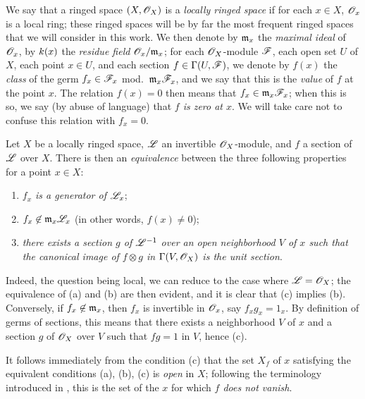 \begin{env}[5.5.1]
\label{0.5.5.1}
We say that a ringed space $(X,\mathscr{O}_X)$ is a \emph{locally ringed space} if for each $x\in X$, $\mathscr{O}_x$ is a local ring;
these ringed spaces will be by far the most frequent ringed spaces that we will consider in this work.
We then denote by $\mathfrak{m}_x$ the \emph{maximal ideal} of $\mathscr{O}_x$, by $k(x)$ the \emph{residue field $\mathscr{O}_x/\mathfrak{m}_x$};
for each $\mathscr{O}_X$-module $\mathscr{F}$, each open set $U$ of $X$, each point $x\in U$, and each section $f\in\Gamma(U,\mathscr{F})$, we denote by $f(x)$ the \emph{class} of the germ $f_x\in\mathscr{F}_x$ mod.~$\mathfrak{m}_x\mathscr{F}_x$, and we say that this is the \emph{value} of $f$ at the point $x$.
The relation $f(x)=0$ then means that $f_x\in\mathfrak{m}_x\mathscr{F}_x$; when this is so, we say (by abuse of language) that \emph{$f$ is zero at $x$}.
We will take care not to confuse this relation with $f_x=0$.
\end{env}

\begin{env}[5.5.2]
\label{0.5.5.2}
Let $X$ be a locally ringed space, $\mathscr{L}$ an invertible $\mathscr{O}_X$-module, and $f$ a section of $\mathscr{L}$ over $X$.
There is then an \emph{equivalence} between the three following properties for a point $x\in X$:
\begin{enumerate}[label=(\alph*)]
  \item \emph{$f_x$ is a generator of $\mathscr{L}_x$};
  \item \emph{$f_x\not\in\mathfrak{m}_x\mathscr{L}_x$} (in other words, $f(x)\neq 0$);
  \item \emph{there exists a section $g$ of $\mathscr{L}^{-1}$ over an open neighborhood $V$ of $x$ such that the canonical image of $f\otimes g$ in $\Gamma(V,\mathscr{O}_X)$  is the unit section}.
\end{enumerate}

Indeed, the question being local, we can reduce to the case where $\mathscr{L}=\mathscr{O}_X$;
the equivalence of (a) and (b) are then evident, and it is clear that (c) implies (b).
Conversely, if $f_x\not\in\mathfrak{m}_x$, then $f_x$ is invertible in $\mathscr{O}_x$, say $f_x g_x=1_x$.
By definition of germs of sections, this means that there exists a neighborhood $V$ of $x$ and a section $g$ of $\mathscr{O}_X$ over $V$ such that $fg=1$ in $V$, hence (c).

It follows immediately from the condition (c) that the set $X_f$ of $x$ satisfying the equivalent conditions (a), (b), (c) is \emph{open} in $X$;
following the terminology introduced in , this is the set of the $x$ for which \emph{$f$ does not vanish}.
\end{env}

